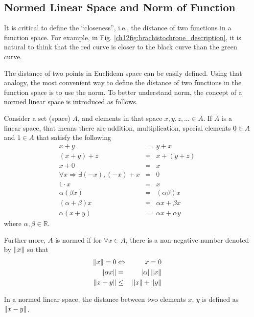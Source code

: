 \subsection{Normed Linear Space and Norm of Function}

It is critical to define the ``closeness'', i.e., the distance of two functions in a function space. For example, in Fig. \ref{ch12fig:brachistochrone_description}, it is natural to think that the red curve is closer to the black curve than the green curve. 

The distance of two points in Euclidean space can be easily defined. Using that analogy, the most convenient way to define the distance of two functions in the function space is to use the norm. To better understand norm, the concept of a normed linear space is introduced as follows.

Consider a set (space) $A$, and elements in that space $x, y, z, ... \in A$. If $A$ is a linear space, that means there are addition, multiplication, special elements $0\in A$ and $1\in A$ that satisfy the following
\begin{eqnarray}
	x + y &=& y + x \nonumber \\
	(x + y) + z &=& x + (y + z) \nonumber \\
	x + 0 &=& x \nonumber \\
	\forall x \Rightarrow \exists (-x), (-x) + x &=& 0 \nonumber \\
	1 \cdot x &=& x \nonumber \\
	\alpha(\beta x) &=& (\alpha\beta)x \nonumber \\
	(\alpha + \beta)x &=& \alpha x + \beta x \nonumber \\
	\alpha(x+y) &=& \alpha x + \alpha y \nonumber
\end{eqnarray}
where $\alpha, \beta \in \mathbb{R}$.

Further more, $A$ is normed if for $\forall x \in A$, there is a non-negative number denoted by $\left\lVert x\right\rVert$ so that
\begin{eqnarray}
	\left\lVert x\right\rVert = 0 &\Leftrightarrow& x = 0 \nonumber \\
	\left\lVert\alpha x\right\rVert &=& |\alpha| \left\lVert x\right\rVert \nonumber \\
	\left\lVert x + y\right\rVert &\leq& \left\lVert x\right\rVert + \left\lVert y\right\rVert \nonumber
\end{eqnarray}

In a normed linear space, the distance between two elements $x$, $y$ is defined as $\left\lVert x-y\right\rVert$.





















